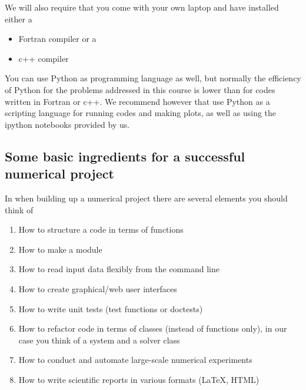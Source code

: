 \documentclass[%
twoside,                 %
final,                   %
10pt]{article}
\begin{document}
We will also require that you come with your own laptop and have installed either a
\begin{itemize}
\item Fortran compiler or a 

\item c++ compiler
\end{itemize}

\noindent
You can use Python as programming language as well, but normally the efficiency of Python for the problems addressed in this course is lower than for codes written in Fortran or c++. We recommend however that use Python as a scripting language for running codes and making plots, as well as using the ipython notebooks provided by us.  

\subsection{Some basic ingredients for a successful numerical project}

In when building up a numerical project there are several elements you should think of
\begin{enumerate}
  \item How to structure a code in terms of functions

  \item How to make a module

  \item How to read input data flexibly from the command line

  \item How to create graphical/web user interfaces

  \item How to write unit tests (test functions or doctests)

  \item How to refactor code in terms of classes (instead of functions only), in our case you think of a system and a solver class

  \item How to conduct and automate large-scale numerical experiments

  \item How to write scientific reports in various formats ({\LaTeX}, HTML)
\end{enumerate}
\end{document}
